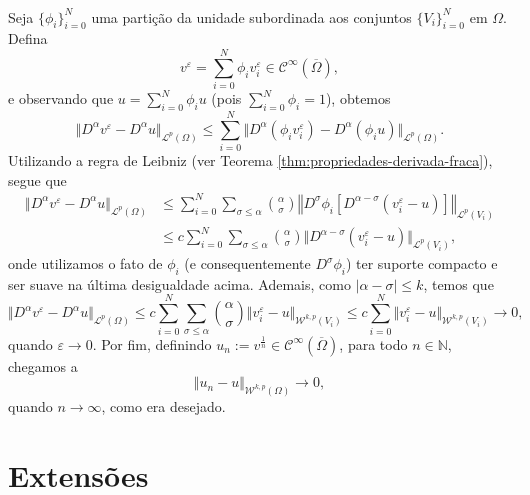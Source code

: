 \documentclass[a4paper, 11pt]{book}
\theoremstyle{definition}
\newcommand{\bN}{\mathbb{N}}
\newcommand{\cC}{\mathcal{C}}
\newcommand{\cL}{\mathcal{L}}
\newcommand{\cW}{\mathcal{W}}
\begin{document}
\begin{prf}
\begin{figure}
        \caption{~}
        \label{fig:coberturafronteirav0}
    \end{figure}
    Seja $\{\phi_i\}_{i=0}^N$ uma partição da unidade subordinada aos conjuntos $\{V_i\}_{i=0}^N$ em $\Omega$.
    Defina
    \[
        v^\varepsilon = \sum_{i=0}^N \phi_i v_i^\varepsilon \in \cC^{\infty}(\overline\Omega),
    \]
    e observando que $u = \sum_{i=0}^N \phi_i u$ (pois $\sum_{i=0}^N \phi_i = 1$), obtemos
    \[
        \Vert D^\alpha v^\varepsilon - D^\alpha u \Vert_{\cL^p(\Omega)} \leqslant \sum_{i=0}^N \Vert D^\alpha (\phi_i v_i^\varepsilon) - D^\alpha(\phi_i u) \Vert_{\cL^p(\Omega)}.
    \]
    Utilizando a regra de Leibniz (ver Teorema \ref{thm:propriedades-derivada-fraca}), segue que
    \[
        \begin{aligned}
            \Vert D^\alpha v^\varepsilon - D^\alpha u \Vert_{\cL^p(\Omega)} &\leqslant \sum_{i=0}^N\sum_{\sigma \leqslant \alpha} \binom{\alpha}{\sigma} \left\Vert  D^{\sigma} \phi_i \left[ D^{\alpha - \sigma} \left( v_i^\varepsilon - u \right) \right] \right\Vert _{\cL^p(V_i)}\\ 
            &\leqslant c\sum_{i=0}^N\sum_{\sigma \leqslant \alpha} \binom{\alpha}{\sigma} \Vert D^{\alpha-\sigma}(v^\varepsilon_i - u) \Vert_{\cL^p(V_i)},
        \end{aligned}
    \]
    onde utilizamos o fato de $\phi_i$ (e consequentemente $D^\sigma \phi_i$) ter suporte compacto e ser suave na última desigualdade acima. 
    Ademais, como $|\alpha - \sigma| \leqslant k$, temos que
    \[
        \Vert D^\alpha v^\varepsilon - D^\alpha u \Vert_{\cL^p(\Omega)} \leqslant c \sum_{i=0}^N\sum_{\sigma \leqslant \alpha} \binom{\alpha}{\sigma} \Vert v_i^\varepsilon - u \Vert_{\cW^{k,p}(V_i)} \leqslant c\sum_{i=0}^N \Vert v_i^\varepsilon - u \Vert_{\cW^{k,p}(V_i)} \to 0 ,
    \]
    quando $\varepsilon \to 0$.
    Por fim, definindo $u_n := v^{\frac{1}{n}} \in \cC^{\infty}(\overline\Omega)$, para todo $n \in \bN$, chegamos a 
    \[
        \Vert u_n - u \Vert_{\cW^{k,p}(\Omega)} \to 0,
    \]
    quando $n \to \infty$, como era desejado.
\end{prf}

\section{Extensões}
\end{document}
